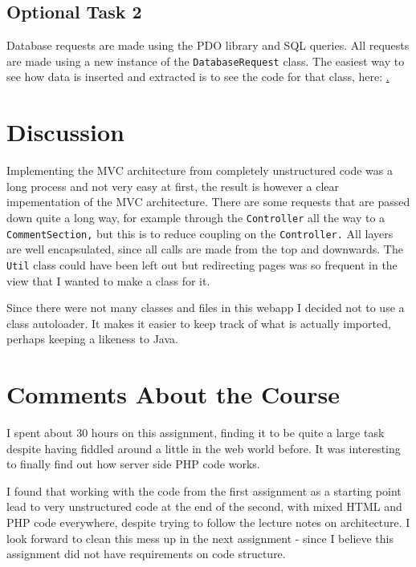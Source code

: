 \documentclass[a4paper]{scrreprt}
\newcommand{\code}[1]{\texttt{#1}}
\begin{document}
\section{Optional Task 2}

Database requests are made using the PDO library and SQL queries. All requests are made using a new instance of the \code{DatabaseRequest} class. The easiest way to see how data is inserted and extracted is to see the code for that class, here: \href{https://github.com/fongie/TastyRecipes/blob/assignment3/src/integration/DatabaseRequest.php}.

\chapter{Discussion}

Implementing the MVC architecture from completely unstructured code was a long process and not very easy at first, the result is however a clear impementation of the MVC architecture. There are some requests that are passed down quite a long way, for example through the \code{Controller} all the way to a \code{CommentSection,} but this is to reduce coupling on the \code{Controller.} All layers are well encapsulated, since all calls are made from the top and downwards. The \code{Util} class could have been left out but redirecting pages was so frequent in the view that I wanted to make a class for it. 

Since there were not many classes and files in this webapp I decided not to use a class autoloader. It makes it easier to keep track of what is actually imported, perhaps keeping a likeness to Java.


\chapter{Comments About the Course}

I spent about 30 hours on this assignment, finding it to be quite a large task despite having fiddled around a little in the web world before. It was interesting to finally find out how server side PHP code works. 

I found that working with the code from the first assignment as a starting point lead to very unstructured code at the end of the second, with mixed HTML and PHP code everywhere, despite trying to follow the lecture notes on architecture. I look forward to clean this mess up in the next assignment - since I believe this assignment did not have requirements on code structure.
\end{document}
